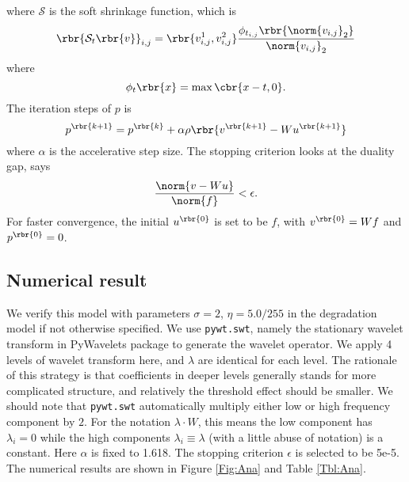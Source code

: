 \documentclass[english, nochinese]{pnote}
\begin{document}
where $\mathcal{S}$ is the soft shrinkage function, which is
\begin{equation}
\rbr{ \mathcal{S}_t \rbr{v} }_{ i, j } = \rbr{ v_{ i, j }^1, v_{ i, j }^2 } \frac{ \phi_{t_{ i, j }} \rbr{\norm{v_{ i, j }}_2} }{\norm{v_{ i, j }}_2}
\end{equation}
where
\begin{equation}
\phi_t \rbr{x} = \max \cbr{ x - t, 0 }.
\end{equation}
The iteration steps of $p$ is
\begin{equation}
p^{\rbr{ k + 1 }} = p^{\rbr{k}} + \alpha \rho \rbr{ v^{\rbr{ k + 1 }} - W u^{\rbr{ k + 1 }} }
\end{equation}
where $\alpha$ is the accelerative step size. The stopping criterion looks at the duality gap, says
\begin{equation}
\frac{\norm{ v - W u }}{\norm{f}} < \epsilon.
\end{equation}
For faster convergence, the initial $u^{\rbr{0}}$ is set to be $f$, with $ v^{\rbr{0}} = W f $ and $ p^{\rbr{0}} = 0 $.

\subsection{Numerical result}

We verify this model with parameters $ \sigma = 2 $, $ \eta = 5.0 / 255 $ in the degradation model if not otherwise specified. We use \verb"pywt.swt", namely the stationary wavelet transform in PyWavelets package to generate the wavelet operator. We apply 4 levels of wavelet transform here, and $\lambda$ are identical for each level. The rationale of this strategy is that coefficients in deeper levels generally stands for more complicated structure, and relatively the threshold effect should be smaller. We should note that \verb"pywt.swt" automatically multiply either low or high frequency component by $2$. For the notation $ \lambda \cdot W $, this means the low component has $ \lambda_i = 0 $ while the high components $ \lambda_i \equiv \lambda $ (with a little abuse of notation) is a constant. Here $\alpha$ is fixed to 1.618. The stopping criterion $\epsilon$ is selected to be 5e-5. The numerical results are shown in Figure \ref{Fig:Ana} and Table \ref{Tbl:Ana}.
\end{document}
